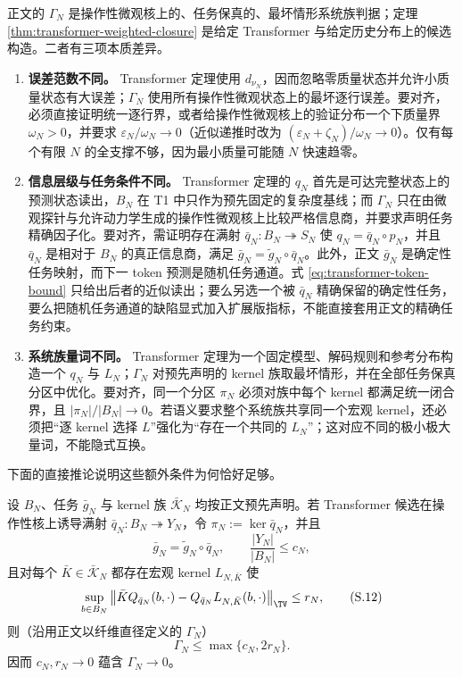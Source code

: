 正文的 $\Gamma_N$ 是操作性微观核上的、任务保真的、最坏情形系统族判据；定理
\ref{thm:transformer-weighted-closure} 是给定 Transformer 与给定历史分布上的候选构造。二者有三项本质差异。

\begin{enumerate}
 \item \textbf{误差范数不同。}
 Transformer 定理使用 $d_{\nu_N}$，因而忽略零质量状态并允许小质量状态有大误差；$\Gamma_N$ 使用所有操作性微观状态上的最坏逐行误差。要对齐，必须直接证明统一逐行界，或者给操作性微观核上的验证分布一个下质量界 $\omega_N>0$，并要求
 $\varepsilon_N/\omega_N\to0$（近似递推时改为
 $(\varepsilon_N+\zeta_N)/\omega_N\to0$）。仅有每个有限 $N$ 的全支撑不够，因为最小质量可能随 $N$ 快速趋零。

 \item \textbf{信息层级与任务条件不同。}
 Transformer 定理的 $q_N$ 首先是可达完整状态上的预测状态读出，$B_N$ 在 T1 中只作为预先固定的复杂度基线；而 $\Gamma_N$ 只在由微观探针与允许动力学生成的操作性微观核上比较严格信息商，并要求声明任务精确因子化。要对齐，需证明存在满射 $\bar q_N:B_N\twoheadrightarrow S_N$ 使
 $q_N=\bar q_N\circ p_N$，并且 $\bar q_N$ 是相对于 $B_N$ 的真正信息商，满足
 $\bar g_N=\widetilde g_N\circ\bar q_N$。此外，正文 $\bar g_N$ 是确定性任务映射，而下一 token 预测是随机任务通道。式
 \eqref{eq:transformer-token-bound} 只给出后者的近似读出；要么另选一个被 $\bar q_N$ 精确保留的确定性任务，要么把随机任务通道的缺陷显式加入扩展版指标，不能直接套用正文的精确任务约束。

 \item \textbf{系统族量词不同。}
 Transformer 定理为一个固定模型、解码规则和参考分布构造一个 $q_N$ 与 $L_N$；$\Gamma_N$ 对预先声明的 kernel 族取最坏情形，并在全部任务保真分区中优化。要对齐，同一个分区 $\pi_N$ 必须对族中每个 kernel 都满足统一闭合界，且
 $|\pi_N|/|B_N|\to0$。若语义要求整个系统族共享同一个宏观 kernel，还必须把“逐 kernel 选择 $L$”强化为“存在一个共同的 $L_N$”；这对应不同的极小极大量词，不能隐式互换。
\end{enumerate}

下面的直接推论说明这些额外条件为何恰好足够。

\begin{proposition}
\label{prop:transformer-gamma-alignment}
设 $B_N$、任务 $\bar g_N$ 与 kernel 族
$\bar{\mathcal K}_N$ 均按正文预先声明。若 Transformer 候选在操作性核上诱导满射
$\bar q_N:B_N\twoheadrightarrow Y_N$，令
$\pi_N:=\ker\bar q_N$，并且
\[
 \bar g_N=\widetilde g_N\circ\bar q_N,
 \qquad \frac{|Y_N|}{|B_N|}\le c_N,
\]
且对每个 $\bar K\in\bar{\mathcal K}_N$ 都存在宏观 kernel
$L_{N,\bar K}$ 使
\[
 \sup_{b\in B_N}
 \left\|\bar KQ_{\bar q_N}(b,\cdot)
       -Q_{\bar q_N}L_{N,\bar K}(b,\cdot)\right\|_{\TV}
 \le r_N,
 \tag{S.12}\label{eq:gamma-aligned-row-bound}
\]
则（沿用正文以纤维直径定义的 $\Gamma_N$）
\[
 \Gamma_N\le\max\{c_N,2r_N\}.
 \tag{S.13}\label{eq:gamma-candidate-upper}
\]
因而 $c_N,r_N\to0$ 蕴含 $\Gamma_N\to0$。
\end{proposition}

